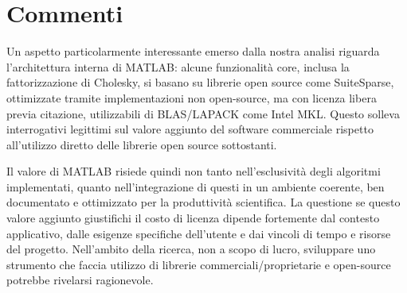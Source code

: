 \section{Commenti}

Un aspetto particolarmente interessante emerso dalla nostra analisi riguarda l'architettura interna di MATLAB: alcune funzionalità core, 
inclusa la fattorizzazione di Cholesky, si basano su librerie open source come SuiteSparse, ottimizzate tramite implementazioni 
non open-source, ma con licenza libera previa citazione, utilizzabili di BLAS/LAPACK come Intel MKL. Questo solleva interrogativi legittimi sul valore aggiunto del software commerciale 
rispetto all'utilizzo diretto delle librerie open source sottostanti.

Il valore di MATLAB risiede quindi non tanto nell'esclusività degli algoritmi implementati, quanto nell'integrazione di questi in un 
ambiente coerente, ben documentato e ottimizzato per la produttività scientifica. La questione se questo valore aggiunto giustifichi il 
costo di licenza dipende fortemente dal contesto applicativo, dalle esigenze specifiche dell'utente e dai vincoli di tempo e risorse del 
progetto.
Nell'ambito della ricerca, non a scopo di lucro, sviluppare uno strumento che faccia utilizzo di librerie commerciali/proprietarie e open-source potrebbe rivelarsi ragionevole.
